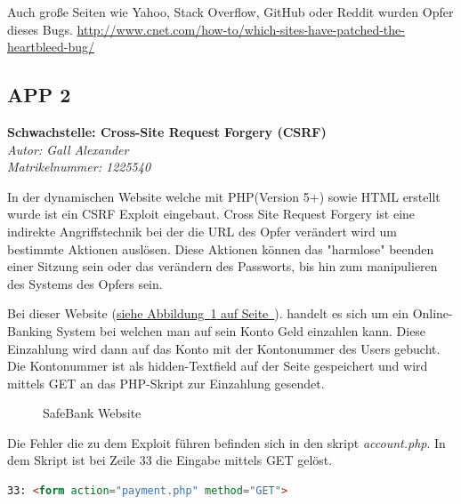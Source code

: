 \documentclass[12pt,a4paper,titlepage,oneside]{scrartcl}
\begin{document}
Auch große Seiten wie Yahoo, Stack Overflow, GitHub oder Reddit wurden Opfer dieses Bugs. \url{http://www.cnet.com/how-to/which-sites-have-patched-the-heartbleed-bug/}

\subsection{APP 2}

\textbf{{\large Schwachstelle:} Cross-Site Request Forgery (CSRF)}\\
\emph{Autor: Gall Alexander\\Matrikelnummer: 1225540}

In der dynamischen Website welche mit PHP(Version 5+) sowie HTML erstellt wurde ist ein CSRF Exploit eingebaut. Cross Site Request Forgery ist eine indirekte Angriffstechnik bei der die URL des Opfer 
verändert wird um bestimmte Aktionen auslösen. Diese Aktionen können das "harmlose" beenden einer Sitzung sein oder das verändern des Passworts, bis hin zum manipulieren des Systems des Opfers sein.

Bei dieser Website (\hyperref[fig:logo6]{siehe Abbildung~\ref*{fig:logo6} auf Seite~\pageref*{fig:logo6}}). handelt es sich um ein Online-Banking System bei welchen man auf 
sein Konto Geld einzahlen kann. Diese Einzahlung wird dann auf das Konto mit der Kontonummer des
Users gebucht. Die Kontonummer ist als hidden-Textfield auf der Seite gespeichert und wird mittels 
GET an das PHP-Skript zur Einzahlung gesendet.

\begin{figure}[h!]
  \centering
  \caption{SafeBank Website}
  \label{fig:logo6}
\end{figure}

Die Fehler die zu dem Exploit führen befinden sich in den skript \textit{account.php}.
In dem Skript ist bei Zeile 33 die Eingabe mittels GET gelöst.\\
\begin{lstlisting}[caption=HTML,language=HTML]
33: <form action="payment.php" method="GET">
\end{lstlisting}
\end{document}
